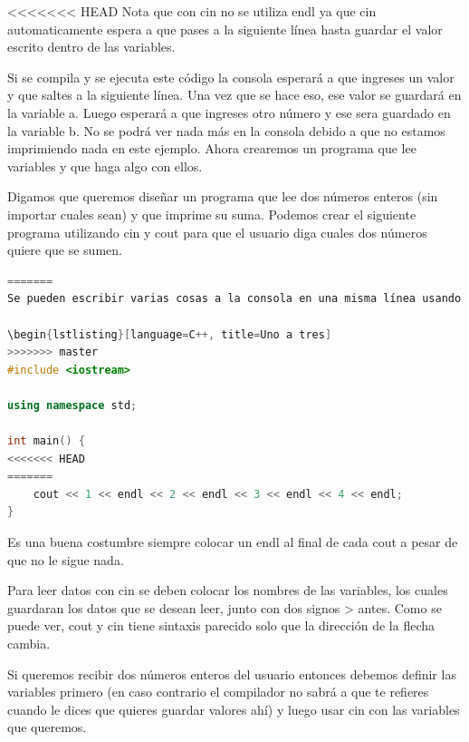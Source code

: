 \documentclass{article}
\begin{document}
<<<<<<< HEAD
Nota que con cin no se utiliza endl ya que cin automaticamente espera a que pases a la siguiente línea hasta guardar el valor escrito dentro de las variables.

Si se compila y se ejecuta este código la consola esperará a que ingreses un valor y que saltes a la siguiente línea. Una vez que se hace eso, ese valor se guardará en la variable a. Luego esperará a que ingreses otro número y ese sera guardado en la variable b. No se podrá ver nada más en la consola debido a que no estamos imprimiendo nada en este ejemplo. Ahora crearemos un programa que lee variables y que haga algo con ellos.

Digamos que queremos diseñar un programa que lee dos números enteros (sin importar cuales sean) y que imprime su suma. Podemos crear el siguiente programa utilizando cin y cout para que el usuario diga cuales dos números quiere que se sumen.

\begin{lstlisting}[language=C++, title=Suma general]
=======
Se pueden escribir varias cosas a la consola en una misma línea usando cout, pero cada expresión debe tener dos signos < antes. Una expresión util de C++ es \textbf{endl}, que sirve como un separador de línea. Es decir, cada vez que se coloca uno de ellos lo que le sigue será escrito en una nueva línea. El siguiente código debe imprimir los números 1, 2, 3 y 4 en nuevas líneas.

\begin{lstlisting}[language=C++, title=Uno a tres]
>>>>>>> master
#include <iostream>

using namespace std;

int main() {
<<<<<<< HEAD
=======
	cout << 1 << endl << 2 << endl << 3 << endl << 4 << endl;
}
\end{lstlisting}

Es una buena costumbre siempre colocar un endl al final de cada cout a pesar de que no le sigue nada.

Para leer datos con cin se deben colocar los nombres de las variables, los cuales guardaran los datos que se desean leer, junto con dos signos > antes. Como se puede ver, cout y cin tiene sintaxis parecido solo que la dirección de la flecha cambia.

Si queremos recibir dos números enteros del usuario entonces debemos definir las variables primero (en caso contrario el compilador no sabrá a que te refieres cuando le dices que quieres guardar valores ahí) y luego usar cin con las variables que queremos.
\end{document}
